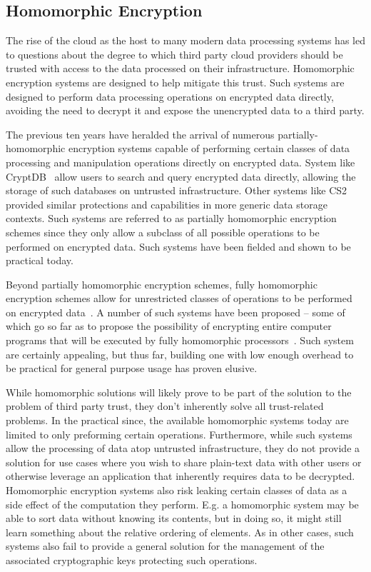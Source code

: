 \subsection{Homomorphic Encryption}

The rise of the cloud as the host to many modern data processing
systems has led to questions about the degree to which third party
cloud providers should be trusted with access to the data processed on
their infrastructure. Homomorphic encryption systems are designed to
help mitigate this trust. Such systems are designed to perform data
processing operations on encrypted data directly, avoiding the need to
decrypt it and expose the unencrypted data to a third party.

The previous ten years have heralded the arrival of numerous
partially-homomorphic encryption systems capable of performing certain
classes of data processing and manipulation operations directly on
encrypted data. System like CryptDB~\cite{popa2011} allow users to
search and query encrypted data directly, allowing the storage of such
databases on untrusted infrastructure. Other systems like
CS2~\cite{kamara2011} provided similar protections and capabilities in
more generic data storage contexts. Such systems are referred to as
partially homomorphic encryption schemes since they only allow a
subclass of all possible operations to be performed on encrypted
data. Such systems have been fielded and shown to be practical today.

Beyond partially homomorphic encryption schemes, fully homomorphic
encryption schemes allow for unrestricted classes of operations to be
performed on encrypted data~\cite{gentry2009}. A number of such
systems have been proposed -- some of which go so far as to propose
the possibility of encrypting entire computer programs that will be
executed by fully homomorphic processors~\cite{Breuer2013,
  Brenner2011}. Such system are certainly appealing, but thus far,
building one with low enough overhead to be practical for general
purpose usage has proven elusive.

While homomorphic solutions will likely prove to be part of the
solution to the problem of third party trust, they don't inherently
solve all trust-related problems. In the practical since, the
available homomorphic systems today are limited to only preforming
certain operations. Furthermore, while such systems allow the
processing of data atop untrusted infrastructure, they do not provide
a solution for use cases where you wish to share plain-text data with
other users or otherwise leverage an application that inherently
requires data to be decrypted. Homomorphic encryption systems also
risk leaking certain classes of data as a side effect of the
computation they perform. E.g. a homomorphic system may be able to
sort data without knowing its contents, but in doing so, it might
still learn something about the relative ordering of elements. As in
other cases, such systems also fail to provide a general solution for
the management of the associated cryptographic keys protecting such
operations.

